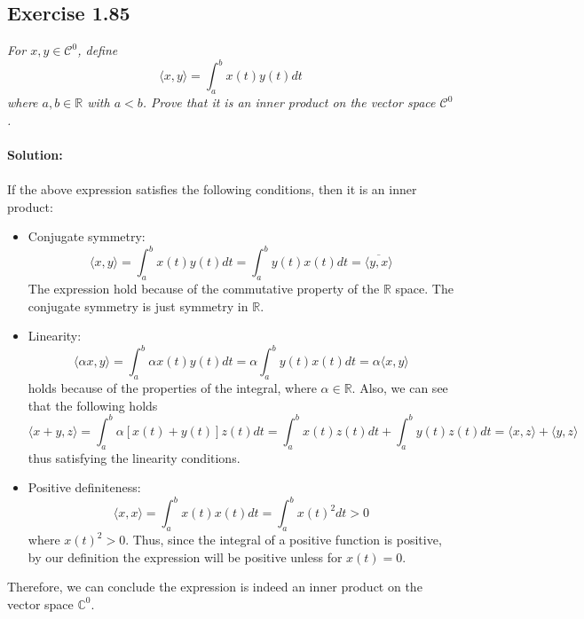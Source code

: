 \subsection{Exercise 1.85}
\emph{For $x, y \in \mathcal{C}^0$, define}
\begin{equation}
    \langle x, y \rangle = \int_a^b x(t)y(t) dt
\end{equation}
\emph{where $a, b \in \mathbb{R}$ with $a < b$. Prove that it is an inner product on the vector space $\mathcal{C}^0$.}\\
\\
\textbf{Solution:}\\
\\
If the above expression satisfies the following conditions, then it is an inner product:
\begin{itemize}
    \item Conjugate symmetry: 
    \begin{equation}
        \langle x, y \rangle = \int_a^b x(t)y(t) dt =\int_a^b  y(t)x(t) dt = \overline{\langle y, x \rangle }
    \end{equation}
    The expression hold because of the commutative property of the $\mathbb{R}$ space. The conjugate symmetry is just symmetry in $\mathbb{R}$.
    \item Linearity:
    \begin{equation}
        \langle \alpha x, y \rangle = \int_a^b \alpha x(t)y(t) dt = \alpha \int_a^b  y(t)x(t) dt = \alpha  \langle x, y \rangle
    \end{equation}
    holds because of the properties of the integral, where $\alpha \in \mathbb{R}$.
    Also, we can see that the following holds
    \begin{equation}
        \langle  x + y, z \rangle = \int_a^b \alpha \left[x(t)+y(t) \right] z(t) dt = \int_a^b  x(t)z(t) dt + \int_a^b  y(t)z(t) dt = \langle  x , z \rangle + \langle  y, z \rangle
    \end{equation}
    thus satisfying the linearity conditions.
    \item Positive definiteness: 
    \begin{equation}
        \langle x, x \rangle = \int_a^b x(t)x(t) dt = \int_a^b x(t)^2 dt > 0
    \end{equation}
    where $x(t)^2 > 0$. Thus, since the integral of a positive function is positive, by our definition the expression will be positive unless for $x(t) = 0$.
\end{itemize}
Therefore, we can conclude the expression is indeed an inner product on the vector space $\mathbb{C}^0$.
\QEDB

